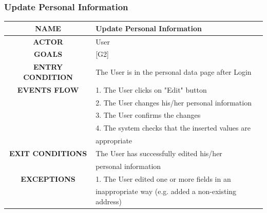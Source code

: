 \documentclass[12pt,a4paper]{article}
\begin{document}
		\subsubsection{Update Personal Information}
		\begin{center}
			\begin{tabular}{| c | l |}
				\hline
				\textbf{NAME} & Update Personal Information \\
				\hline
				\textbf{ACTOR} & User \\
				\hline
				\textbf{GOALS} & [G2] \\
				\hline
				\textbf{ENTRY CONDITION} & The User is in the personal data page after Login\\ \hline
				\textbf{EVENTS FLOW}  &
				1. The User clicks on "Edit" button\\
				&2. The User changes his/her personal information \\
				&3. The User confirms the changes\\
				&4. The system checks that the inserted values are\\
				& appropriate\\
				\hline
				\textbf{EXIT CONDITIONS}
				& The User has successfully edited his/her \\
				& personal information \\ \hline
				\textbf{EXCEPTIONS} &
				1. The User edited one or more fields in an \\
				& inappropriate way (e.g. added a non-existing address)\\
				\hline
			\end{tabular}
		\end{center}
	
		\newpage
\end{document}
